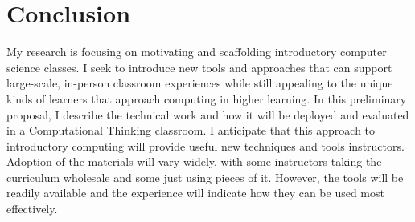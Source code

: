 \section{Conclusion}

My research is focusing on motivating and scaffolding introductory computer science classes.
I seek to introduce new tools and approaches that can support large-scale, in-person classroom experiences while still appealing to the unique kinds of learners that approach computing in higher learning.
In this preliminary proposal, I describe the technical work and how it will be deployed and evaluated in a Computational Thinking classroom.
I anticipate that this approach to introductory computing will provide useful new techniques and tools instructors.
Adoption of the materials will vary widely, with some instructors taking the curriculum wholesale and some just using pieces of it.
However, the tools will be readily available and the experience will indicate how they can be used most effectively.